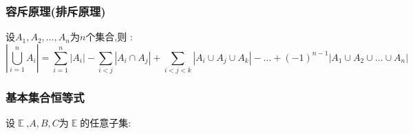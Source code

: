 \documentclass[UTF8,12pt]{ctexbook}
\newcommand{\upDownSum}[2]{\sum\limits_{#2}^{#1}}
\newcommand{\updownUnion}[2]{\bigcup\limits_{#2}^{#1}}
\newcommand{\absoluteValue}[1]{\left\lvert #1 \right\vert}
\DeclareMathOperator{\mathEverythingCollection}{\mathbb{E}}
\DeclareMathOperator{\unionSet}{\cup}
\DeclareMathOperator{\intersectionSet}{\cap}
\begin{document}
{{{{\subsubsection{容斥原理(排斥原理)}{
  设$A_1,A_2,\dots,A_n$为$n$个集合,则 : $$
    \absoluteValue{\updownUnion{n}{i = 1}A_i} = \upDownSum{n}{i = 1}\absoluteValue{A_i} - \upDownSum{\ }{i < j}\absoluteValue{A_i \intersectionSet A_j} + \upDownSum{\ }{i < j < k}\absoluteValue{A_i \unionSet A_j \unionSet A_k} - \dots + (-1)^{n - 1}\absoluteValue{A_1 \unionSet A_2 \unionSet \dots \unionSet A_n}
  $$
}

\subsubsection{基本集合恒等式}{
  设$\mathEverythingCollection$,$A,B,C$为$\mathEverythingCollection$的任意子集:

}}}}}
\end{document}
